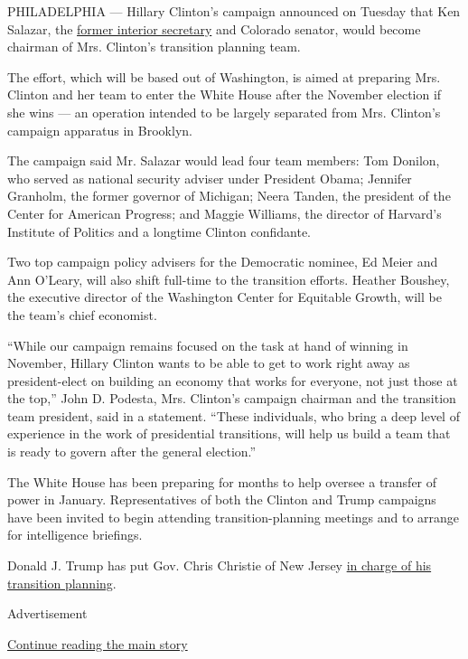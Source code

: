 PHILADELPHIA --- Hillary Clinton's campaign announced on Tuesday that
Ken Salazar, the
\href{http://www.nytimes3xbfgragh.onion/2013/04/06/us/politics/ken-salazar-joyful-run-interior-secretary.html}{former
interior secretary} and Colorado senator, would become chairman of Mrs.
Clinton's transition planning team.

The effort, which will be based out of Washington, is aimed at preparing
Mrs. Clinton and her team to enter the White House after the November
election if she wins --- an operation intended to be largely separated
from Mrs. Clinton's campaign apparatus in Brooklyn.

The campaign said Mr. Salazar would lead four team members: Tom Donilon,
who served as national security adviser under President Obama; Jennifer
Granholm, the former governor of Michigan; Neera Tanden, the president
of the Center for American Progress; and Maggie Williams, the director
of Harvard's Institute of Politics and a longtime Clinton confidante.

Two top campaign policy advisers for the Democratic nominee, Ed Meier
and Ann O'Leary, will also shift full-time to the transition efforts.
Heather Boushey, the executive director of the Washington Center for
Equitable Growth, will be the team's chief economist.

``While our campaign remains focused on the task at hand of winning in
November, Hillary Clinton wants to be able to get to work right away as
president-elect on building an economy that works for everyone, not just
those at the top,'' John D. Podesta, Mrs. Clinton's campaign chairman
and the transition team president, said in a statement. ``These
individuals, who bring a deep level of experience in the work of
presidential transitions, will help us build a team that is ready to
govern after the general election.''

The White House has been preparing for months to help oversee a transfer
of power in January. Representatives of both the Clinton and Trump
campaigns have been invited to begin attending transition-planning
meetings and to arrange for intelligence briefings.

Donald J. Trump has put Gov. Chris Christie of New Jersey
\href{http://www.nytimes3xbfgragh.onion/politics/first-draft/2016/05/09/donald-trump-picks-chris-christie-to-head-possible-transition-team/?_r=0}{in
charge of his transition planning}.

Advertisement

\protect\hyperlink{after-bottom}{Continue reading the main story}

